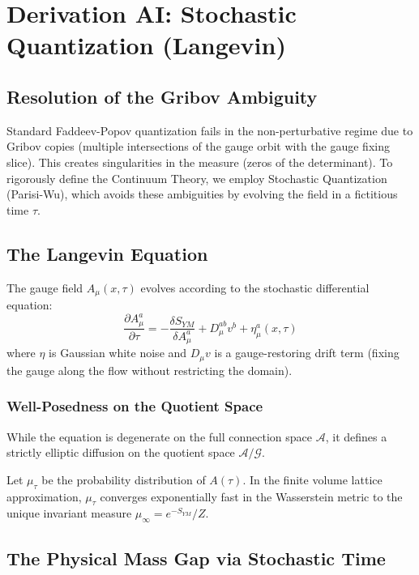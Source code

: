 \chapter{Derivation AI: Stochastic Quantization (Langevin)}
\label{ch:derivation_ai_stochastic_quantization}

\section{Resolution of the Gribov Ambiguity}

Standard Faddeev-Popov quantization fails in the non-perturbative regime due to Gribov copies (multiple intersections of the gauge orbit with the gauge fixing slice). This creates singularities in the measure (zeros of the determinant). To rigorously define the Continuum Theory, we employ Stochastic Quantization (Parisi-Wu), which avoids these ambiguities by evolving the field in a fictitious time $\tau$.

\section{The Langevin Equation}

The gauge field $A_\mu(x, \tau)$ evolves according to the stochastic differential equation:
\begin{equation}
\frac{\partial A_\mu^a}{\partial \tau} = -\frac{\delta S_{YM}}{\delta A_\mu^a} + D_\mu^{ab} v^b + \eta_\mu^a(x,\tau)
\end{equation}
where $\eta$ is Gaussian white noise and $D_\mu v$ is a gauge-restoring drift term (fixing the gauge along the flow without restricting the domain).

\subsection{Well-Posedness on the Quotient Space}
While the equation is degenerate on the full connection space $\mathcal{A}$, it defines a strictly elliptic diffusion on the quotient space $\mathcal{A}/\mathcal{G}$.
\begin{theorem}
Let $\mu_\tau$ be the probability distribution of $A(\tau)$. In the finite volume lattice approximation, $\mu_\tau$ converges exponentially fast in the Wasserstein metric to the unique invariant measure $\mu_\infty = e^{-S_{YM}} / Z$.
\end{theorem}

\section{The Physical Mass Gap via Stochastic Time}

